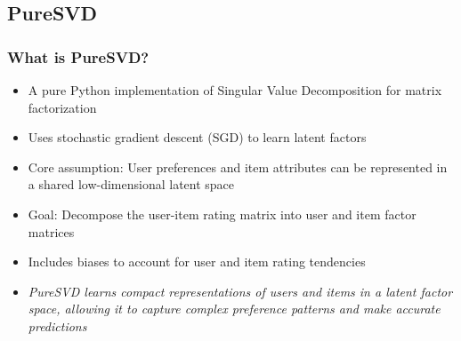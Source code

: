 \documentclass{beamer}
\begin{document}
\subsection{PureSVD}
\begin{frame}
\frametitle{What is PureSVD?}

\begin{itemize}
    \item A pure Python implementation of Singular Value Decomposition for matrix factorization
    \item Uses stochastic gradient descent (SGD) to learn latent factors
    \item Core assumption: User preferences and item attributes can be represented in a shared low-dimensional latent space
    \item Goal: Decompose the user-item rating matrix into user and item factor matrices
    \item Includes biases to account for user and item rating tendencies

    \vspace{1cm}

    \item \textit{PureSVD learns compact representations of users and items in a latent factor space, allowing it to capture complex preference patterns and make accurate predictions}
\end{itemize}
\end{frame}
\end{document}
